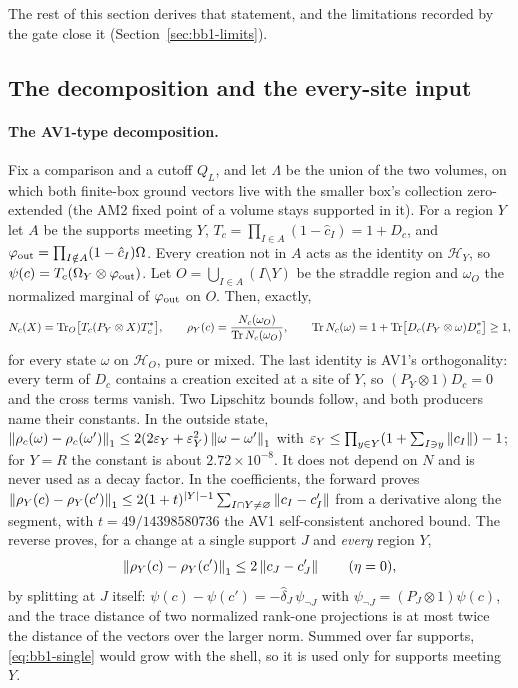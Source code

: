 The rest of this section derives that statement, and the limitations recorded
by the gate close it (Section~\ref{sec:bb1-limits}).

\subsection{The decomposition and the every-site input}
\label{sec:bb1-decomposition}
\paragraph{The AV1-type decomposition.} Fix a comparison and a cutoff
$Q_L$, and let $\Lambda$ be the union of the two volumes, on which both
finite-box ground vectors live with the smaller box's collection zero-extended
(the AM2 fixed point of a volume stays supported in it). For a region $Y$ let
$A$ be the supports meeting $Y$, $T_c=\prod_{I\in A}(1-\hat c_I)=1+D_c$, and
$\varphi_{\rm out}=\prod_{I\notin A}(1-\hat c_I)\Omega$. Every creation not in
$A$ acts as the identity on $\mathcal H_Y$, so
$\psi(c)=T_c(\Omega_Y\otimes\varphi_{\rm out})$. Let
$O=\bigcup_{I\in A}(I\setminus Y)$ be the straddle region and $\omega_O$ the
normalized marginal of $\varphi_{\rm out}$ on $O$. Then, exactly,
\begin{equation}
 N_c(X)=\operatorname{Tr}_O\bigl[T_c(P_Y\otimes X)T_c^*\bigr],\qquad
 \rho_Y(c)=\frac{N_c(\omega_O)}{\operatorname{Tr} N_c(\omega_O)},\qquad
 \operatorname{Tr} N_c(\omega)=1+\operatorname{Tr}\bigl[D_c(P_Y\otimes\omega)D_c^*\bigr]\ge1 ,
 \label{eq:bb1-decomposition}
\end{equation}
for every state $\omega$ on $\mathcal H_O$, pure or mixed. The last identity is
AV1's orthogonality: every term of $D_c$ contains a creation excited at a site
of $Y$, so $(P_Y\otimes1)D_c=0$ and the cross terms vanish. Two Lipschitz
bounds follow, and both producers name their constants. In the outside state,
$\left\lVert\rho_c(\omega)-\rho_c(\omega')\right\rVert_1\le2(2\varepsilon_Y+\varepsilon_Y^2)
\left\lVert\omega-\omega'\right\rVert_1$ with
$\varepsilon_Y\le\prod_{y\in Y}(1+\sum_{I\ni y}\left\lVert c_I\right\rVert)-1$; for $Y=R$ the
constant is about $2.72\times10^{-8}$. It does not depend on $N$ and is never
used as a decay factor. In the coefficients, the forward proves
$\left\lVert\rho_Y(c)-\rho_Y(c')\right\rVert_1\le2(1+t)^{|Y|-1}\sum_{I\cap Y\ne\varnothing}
\left\lVert c_I-c'_I\right\rVert$ from a derivative along the segment, with
$t=49/14398580736$ the AV1 self-consistent anchored bound. The reverse proves,
for a change at a single support $J$ and \emph{every} region $Y$,
\begin{equation}
 \left\lVert\rho_Y(c)-\rho_Y(c')\right\rVert_1\le2\left\lVert c_J-c'_J\right\rVert\qquad(\eta=0),
 \label{eq:bb1-single}
\end{equation}
by splitting at $J$ itself: $\psi(c)-\psi(c')=-\hat\delta_J\,\psi_{\neg J}$
with $\psi_{\neg J}=(P_J\otimes1)\psi(c)$, and the trace distance of two
normalized rank-one projections is at most twice the distance of the vectors
over the larger norm. Summed over far supports, \eqref{eq:bb1-single} would
grow with the shell, so it is used only for supports meeting $Y$.

